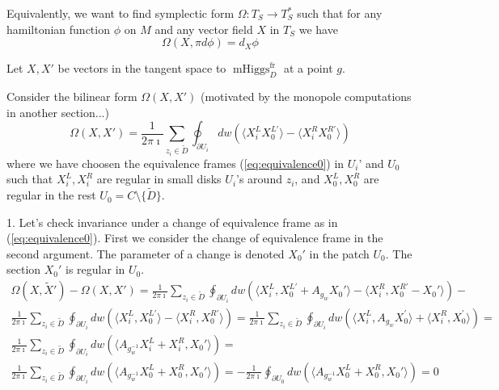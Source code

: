 \documentclass[11pt, oneside, reqno]{amsart}
\theoremstyle{definition} \newtheorem{definition}{Definition}[section]
\theoremstyle{definition} \newtheorem{remark}[definition]{Remark}
\theoremstyle{definition} \newtheorem{remarks}[definition]{Remarks}
\theoremstyle{definition} \newtheorem{question}[definition]{Question}
\theoremstyle{definition} \newtheorem*{note}{Note}
\theoremstyle{definition} \newtheorem{example}[definition]{Example}
\theoremstyle{definition} \newtheorem{examples}[definition]{Examples}
\DeclareMathOperator{\mhiggs}{mHiggs}
\newcommand{\fr}{\mathrm{fr}}
\begin{document}
 Equivalently, we want to find symplectic form $\Omega: T_{S} \to T_{S}^{*} $ such
 that for any hamiltonian function $\phi$ on $M$ and any vector field $X$ in $T_{S}$ we
 have
 \begin{equation}
   \Omega(X, \pi d \phi) = d_{X} \phi 
 \end{equation}

 Let $X, X'$ be vectors in the tangent space to $\mhiggs^{\fr}_D$ at a point $g$.

 Consider the bilinear form $\Omega(X, X')$ (motivated by the monopole
 computations in another section...) 
 \begin{equation}
\label{eq:Omega}
   \Omega(X, X')  = \frac{1}{2 \pi \imath} \sum_{z_i \in \tilde D} \oint_{\partial U_i}  dw (
\langle  X^{L}_{i} X^{L'}_{0} \rangle  - \langle X^{R}_{i}  X^{R'}_{0} \rangle )
\end{equation}
where we have choosen the equivalence frames (\ref{eq:equivalence0}) in $U_i$' and $U_0$ such that $X_i^{L}, X_i^{R}$ are regular in small disks $U_i$'s around $z_i$, and $X_0^{L}, X_{0}^{R}$ are regular in
the rest $U_0  = C \setminus \{\tilde D\}$. 

1. Let's check invariance under a change of equivalence frame 
as in (\ref{eq:equivalence0}). First we consider the change
of equivalence frame in the second argument. 
The parameter of a change is denoted $X_0'$ in the patch $U_0$. The section $X_{0}'$ is regular in $U_{0}$. 
\begin{multline}
   \Omega(X, \tilde X') - \Omega( X,X')  = \frac{1}{2 \pi \imath} \sum_{z_i \in \tilde D} \oint_{\partial U_i}  dw (
   \langle  X^{L}_{i} ,  X^{L'}_{0} + A_{g_{w}} X_{0}' \rangle  - \langle X^{R}_{i} ,  X^{R'}_{0} - X_{0}'\rangle ) - \\
   \frac{1}{2 \pi \imath} \sum_{z_i \in \tilde D} \oint_{\partial U_i}  dw (
   \langle  X^{L}_{i} ,  X^{L'}_{0} \rangle  - \langle X^{R}_{i} ,  X^{R'}_{0} \rangle )   =
\frac{1}{2 \pi \imath} \sum_{z_i \in \tilde D} \oint_{\partial U_i}  dw (
\langle   X_{i}^{L},   A_{g_{w}}X^{'}_{0} \rangle  + \langle  X_{i}^{R},  X^{'}_{0} \rangle ) = \\
\frac{1}{2 \pi \imath} \sum_{z_i \in \tilde D} \oint_{\partial U_i}  dw (
\langle   A_{g_{w}^{-1}}  X_{i}^{L} + X_{i}^{R}, X_{0}' \rangle )  =\\
\frac{1}{2 \pi \imath} \sum_{z_i \in \tilde D} \oint_{\partial U_i}  dw (
\langle   A_{g_{w}^{-1}}  X_{0}^{L} + X_{0}^{R}, X_{0}' \rangle )  =
- \frac{1}{2 \pi \imath} \oint_{\partial U_0} dw (
\langle   A_{g_{w}^{-1}}  X_{0}^{L} + X_{0}^{R}, X_{0}' \rangle )  = 0 \\
\end{multline}
\end{document}
